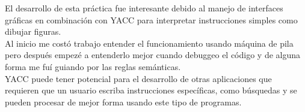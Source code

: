 El desarrollo de esta práctica fue interesante debido al manejo de interfaces
gráficas en combinación con YACC para interpretar instrucciones simples como
dibujar figuras. \\
Al inicio me costó trabajo entender el funcionamiento usando máquina de pila 
pero después empezé a entenderlo mejor cuando debuggeo el código y de alguna 
forma me fuí guiando por las reglas semánticas.\\
YACC puede tener potencial para el desarrollo de otras aplicaciones que requieren
que un usuario escriba instrucciones específicas, como búsquedas y se pueden 
procesar de mejor forma usando este tipo de programas.